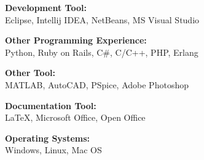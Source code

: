 \documentclass[10pt]{article}
\newcommand{\blankline}{\quad\pagebreak[2]}
\begin{document}
\blankline

{\textbf{Development Tool:}}\\
Eclipse, Intellij IDEA, NetBeans, MS Visual Studio

\blankline

{\textbf{Other Programming Experience:}}\\
Python, Ruby on Rails, C\#, C/C++, PHP, Erlang

\blankline

{\textbf{Other Tool:}}\\
MATLAB, AutoCAD, PSpice, Adobe Photoshop

\blankline

{\textbf{Documentation Tool:}}\\ 
\LaTeX{}, Microsoft Office, Open Office

\blankline

{\textbf{Operating Systems:}}\\
Windows, Linux, Mac OS

\newpage
\end{document}
